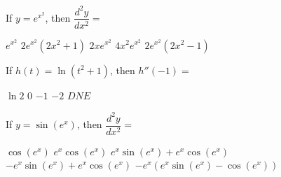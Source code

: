 \begin{questions}
    \question If $y = e^{x^2}$, then $\dfrac{d^2y}{dx^2} = $ \\

    \begin{oneparchoices}
        \choice $e^{x^2}$
        \choice $2e^{x^2}\left(2x^2 + 1\right)$
        \choice $2xe^{x^2}$
        \choice $4x^2e^{x^2}$
        \choice $2e^{x^2}\left(2x^2 - 1\right)$
    \end{oneparchoices} \par \horizontalline

    \question If $h(t) = \ln \left(t^2 + 1\right)$, then $h''(-1) = $ \\

    \begin{oneparchoices}
        \choice $\ln 2$
        \choice $0$
        \choice $-1$
        \choice $-2$
        \choice $DNE$
    \end{oneparchoices} \par \horizontalline

    \question If $y = \sin \left(e^x\right)$, then $\dfrac{d^2y}{dx^2} = $ \\

    \begin{oneparchoices}
        \choice $\cos \left(e^x\right)$
        \choice $e^x \cos \left(e^x\right)$
        \choice $e^x\sin \left(e^x\right) + e^x\cos \left(e^x\right)$ \\[11pt]
        \makebox[0.12\textwidth] \choice $-e^x\sin \left(e^x\right) + e^x\cos \left(e^x\right)$
        \makebox[0.20\textwidth]\choice $-e^x\left(e^x\sin \left(e^x\right) - \cos \left(e^x\right)\right)$
    \end{oneparchoices} \par \horizontalline
\end{questions}
